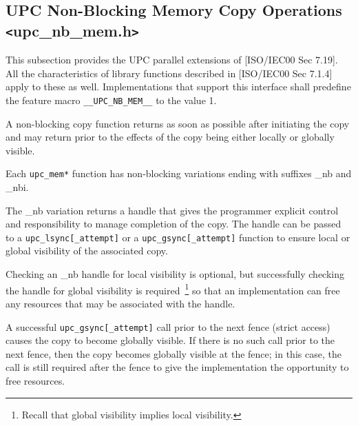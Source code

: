 \def \memcpy  {{\tt upc\_memcpy}}
\def \memget  {{\tt upc\_memget}}
\def \memput  {{\tt upc\_memput}}
\def \memset  {{\tt upc\_memset}}

\def \memall  {{\tt upc\_mem\{put, get, cpy\}}}
\def \memstar {{\tt upc\_mem*}}

\def \gsync  {{\tt upc\_gsync[\_attempt]}}
\def \gsynci {{\tt upc\_gsynci[\_attempt]}}
\def \lsync  {{\tt upc\_lsync[\_attempt]}}
\def \lsynci {{\tt upc\_lsynci[\_attempt]}}

\def \complete {{\tt UPC\_COMPLETE\_HANDLE}}

\subsection{UPC Non-Blocking Memory Copy Operations
            \texttt{<}upc\_nb\_mem.h\texttt{>}}

\npf This subsection provides the UPC parallel extensions of [ISO/IEC00 Sec
7.19].  All the characteristics of library functions described in [ISO/IEC00 Sec
7.1.4] apply to these as well.  Implementations that support this interface
shall predefine the feature macro {\tt \_\_UPC\_NB\_MEM\_\_} to the value 1.

\np A non-blocking copy function returns as soon as possible after initiating
the copy and may return prior to the effects of the copy being either locally or
globally visible.

\np Each \memstar{} function has non-blocking variations ending with suffixes
\_nb and \_nbi.

\np The \_nb variation returns a handle that gives the programmer explicit
control and responsibility to manage completion of the copy.  The handle can be
passed to a \lsync{} or a \gsync{} function to ensure local or global visibility
of the associated copy.

\np Checking an \_nb handle for local visibility is optional, but successfully
checking the handle for global visibility is required~\footnote{Recall that
global visibility implies local visibility.} so that an implementation can free
any resources that may be associated with the handle.

\np A successful \gsync{} call prior to the next fence (strict access) causes
the copy to become globally visible.  If there is no such call prior to the next
fence, then the copy becomes globally visible at the fence; in this case, the
call is still required after the fence to give the implementation the
opportunity to free resources.

